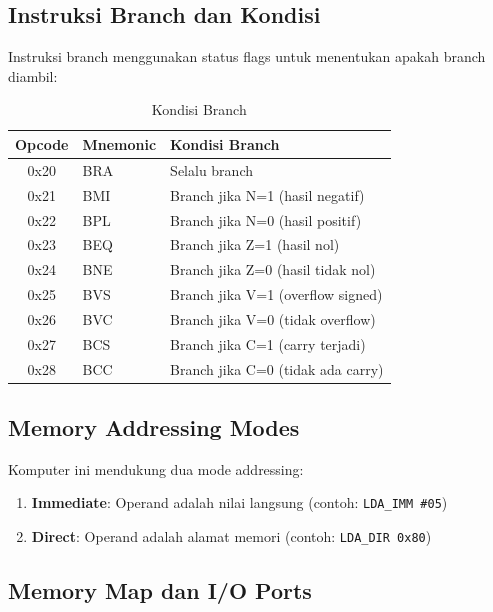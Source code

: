 \documentclass[12pt,a4paper]{report}
\begin{document}
\subsection{Instruksi Branch dan Kondisi}

Instruksi branch menggunakan status flags untuk menentukan apakah branch diambil:

\begin{table}[H]
  \centering
  \small
  \begin{tabular}{|c|l|l|}
    \hline
    \textbf{Opcode} & \textbf{Mnemonic} & \textbf{Kondisi Branch} \\
    \hline
    0x20 & BRA & Selalu branch \\
    0x21 & BMI & Branch jika N=1 (hasil negatif) \\
    0x22 & BPL & Branch jika N=0 (hasil positif) \\
    0x23 & BEQ & Branch jika Z=1 (hasil nol) \\
    0x24 & BNE & Branch jika Z=0 (hasil tidak nol) \\
    0x25 & BVS & Branch jika V=1 (overflow signed) \\
    0x26 & BVC & Branch jika V=0 (tidak overflow) \\
    0x27 & BCS & Branch jika C=1 (carry terjadi) \\
    0x28 & BCC & Branch jika C=0 (tidak ada carry) \\
    \hline
  \end{tabular}
  \caption{Kondisi Branch}
\end{table}

\subsection{Memory Addressing Modes}

Komputer ini mendukung dua mode addressing:

\begin{enumerate}
  \item \textbf{Immediate}: Operand adalah nilai langsung (contoh: \texttt{LDA\_IMM \#05})
  \item \textbf{Direct}: Operand adalah alamat memori (contoh: \texttt{LDA\_DIR 0x80})
\end{enumerate}

\subsection{Memory Map dan I/O Ports}
\end{document}
